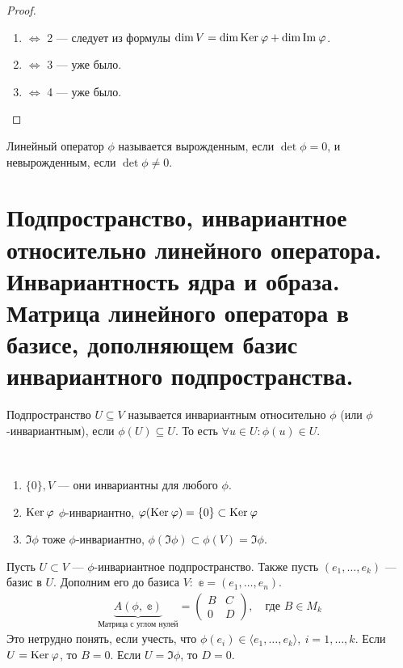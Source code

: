 \begin{proof}\ 
    \begin{enumerate}
        \item $\Leftrightarrow$ 2 --- следует из формулы $\dim V = \dim \mathrm{Ker}\: \varphi + \dim \mathrm{Im\:} \varphi$.
        \item $\Leftrightarrow$ 3 --- уже было.
        \item $\Leftrightarrow$ 4 --- уже было.
    \end{enumerate}
\end{proof}

\begin{Def}
    Линейный оператор $\phi$ называется вырожденным, если $\det \phi = 0$, и невырожденным, если $\det \phi \neq 0$.
\end{Def}

\section{Подпространство, инвариантное относительно линейного оператора. Инвариантность ядра и образа. Матрица линейного оператора в базисе, дополняющем базис инвариантного подпространства.}

\begin{Def} 
    Подпространство $U \subseteq V$ называется инвариантным относительно $\phi$ (или $\phi$-инвариантным), если $\phi(U)\subseteq U$. То есть $\forall u\in U \colon \phi(u)\in U$. 
\end{Def}

\begin{Examples}\
    \begin{enumerate}
        \item $\{0\}, V$ --- они инвариантны для любого $\phi$.
        \item $\mathrm{Ker}\:\varphi$ $\phi$-инвариантно, $\varphi(\mathrm{Ker}\:\varphi) = \{0\} \subset \mathrm{Ker}\:\varphi$
        \item $\Im\phi$ тоже $\phi$-инвариантно, $\phi(\Im\phi)\subset \phi(V) = \Im \phi$.
    \end{enumerate}
\end{Examples}

Пусть $U\subset V$ --- $\phi$-инвариантное подпространство. Также пусть $(e_1, \ldots, e_k)$ --- базис в $U$. Дополним его до базиса $V\colon$ $\mathbb{e} = (e_1, \ldots, e_n)$. 
\begin{gather}
    \underbrace{A(\phi,\;\mathbb{e})}_{\text{Матрица с углом нулей}} = \begin{pmatrix}
    B& C \\
    0& D
    \end{pmatrix}, \quad\text{где $B\in M_k$}
\end{gather}
Это нетрудно понять, если учесть, что $\phi(e_i)\in \langle e_1, \ldots, e_k\rangle,\ i=1,\dots, k$.
Если $U = \mathrm{Ker}\: \varphi$, то $B = 0$. Если $U = \Im \phi$, то $D = 0$. 

